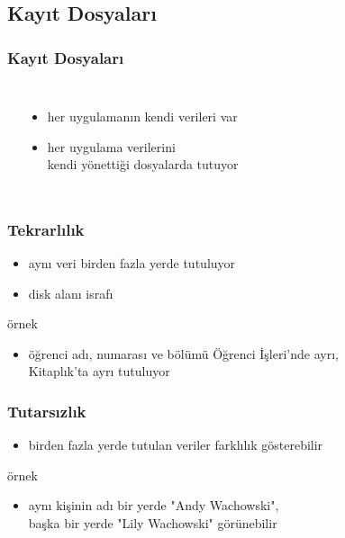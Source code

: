\documentclass[dvipsnames]{beamer}
\theoremstyle{plain}
\begin{document}
\subsection{Kayıt Dosyaları}

\begin{frame}
  \frametitle{Kayıt Dosyaları}

  \begin{columns}[b]
    \begin{center}
    \end{center}

    \begin{itemize}
      \item her uygulamanın kendi verileri var
      \item her uygulama verilerini\\
	kendi yönettiği dosyalarda tutuyor
    \end{itemize}
  \end{columns}
\end{frame}


\begin{frame}
  \frametitle{Tekrarlılık}

  \begin{itemize}
    \item aynı veri birden fazla yerde tutuluyor
    \item disk alanı israfı
  \end{itemize}

 \medskip
  \begin{exampleblock}{örnek}
    \begin{itemize}
      \item öğrenci adı, numarası ve bölümü Öğrenci İşleri'nde ayrı,\\
	Kitaplık'ta ayrı tutuluyor
    \end{itemize}
  \end{exampleblock}
\end{frame}

\begin{frame}
  \frametitle{Tutarsızlık}

  \begin{itemize}
    \item birden fazla yerde tutulan veriler farklılık gösterebilir
  \end{itemize}

  \medskip
 \begin{exampleblock}{örnek}
    \begin{itemize}
      \item aynı kişinin adı bir yerde "Andy Wachowski",\\
        başka bir yerde "Lily Wachowski" görünebilir
    \end{itemize}
  \end{exampleblock}
\end{frame}
\end{document}
